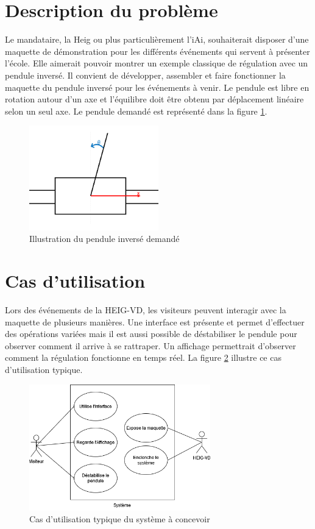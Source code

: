 \section{Description du problème}\label{sec:DescProb}
Le mandataire, la \acrshort{Heig} ou plus particulièrement l'\acrshort{iAi}, souhaiterait disposer d'une maquette de démonstration pour les différents événements qui servent à présenter l'école. Elle aimerait pouvoir montrer un exemple classique de régulation avec un pendule inversé.
Il convient de développer, assembler et faire fonctionner la maquette du pendule inversé pour les événements à venir. Le pendule est libre en rotation autour d'un axe et l'équilibre doit être obtenu par déplacement linéaire selon un seul axe. Le pendule demandé est représenté dans la figure \ref{fig:Illustration}.

\begin{figure}[H]
    \centering
    \includegraphics[width = 0.5\textwidth]{assets/figures/IllustrationPendule.png}
    \caption{Illustration du pendule inversé demandé}
    \label{fig:Illustration}
\end{figure}

\section{Cas d'utilisation}\label{sec:CasUtil}
Lors des événements de la HEIG-VD, les visiteurs peuvent interagir avec la maquette de plusieurs manières. Une interface est présente et permet d'effectuer des opérations variées mais il est aussi possible de déstabiliser le pendule pour observer comment il arrive à se rattraper. Un affichage permettrait d'observer comment la régulation fonctionne en temps réel.
La figure \ref{fig:CasUtil} illustre ce cas d'utilisation typique.

\begin{figure}[H]
    \centering
    \includegraphics[width = 0.7\textwidth]{assets/figures/CasUtil.png}
    \caption{Cas d'utilisation typique  du système à concevoir}
    \label{fig:CasUtil}
\end{figure}

